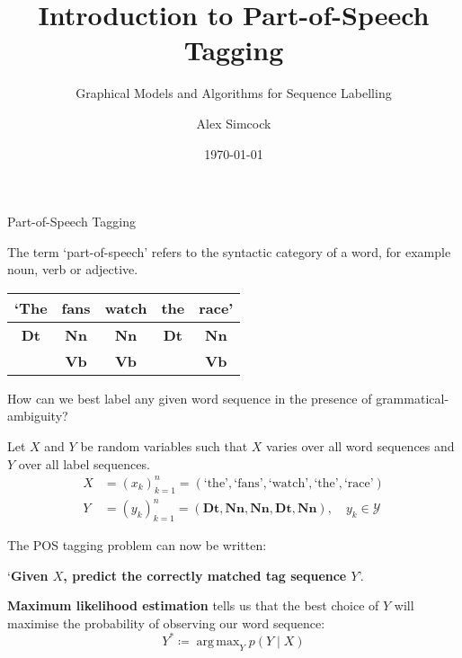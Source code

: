 \documentclass[envcountsect]{beamer}
\title{Introduction to Part-of-Speech Tagging}
\subtitle{Graphical Models and Algorithms for Sequence Labelling}
\author{Alex Simcock}
\institute{University of Birmingham}
\date{\today}
\DeclareMathOperator*{\argmax}{arg\,max}
\begin{document}
\begin{frame}
\titlepage
\end{frame}

\begin{frame}{Part-of-Speech Tagging}

\begin{definition}
The term `part-of-speech' refers to the syntactic category of a word, for example noun, verb or adjective.
\end{definition}

\begin{example}
\begin{center}
\begin{tabular}{ c c c c c }
 `The & fans & watch & the & race' \\
 \hline
 \textbf{Dt} & \textbf{Nn} & \textbf{Nn} & \textbf{Dt} & \textbf{Nn} \\  
 & \textbf{Vb} & \textbf{Vb} & & \textbf{Vb}    
\end{tabular}
\end{center}
\end{example}

How can we best label any given word sequence in the presence of grammatical-ambiguity?


\end{frame}

\begin{frame}

\begin{definition}

Let $X$ and $Y$ be random variables such that $X$ varies over all word sequences and $Y$ over all label sequences.
\begin{align*}
    X &= (x_k)_{k=1}^n = (\text{`the'}, \text{`fans'}, \text{`watch'}, \text{`the'}, \text{`race'}) \\
    Y &= (y_k)_{k=1}^n = (\textbf{Dt}, \textbf{Nn}, \textbf{Nn}, \textbf{Dt}, \textbf{Nn}), \quad y_k \in \mathcal{Y}
\end{align*}

The POS tagging problem can now be written:

`\textbf{Given $X$, predict the correctly matched tag sequence $Y$}'.

\end{definition}

\pause

\textbf{Maximum likelihood estimation} tells us that the best choice of $Y$ will maximise the probability of observing our word sequence:
\begin{equation*}
    Y^* \coloneqq \argmax_{Y} p(Y \mid X)
\end{equation*}    

\end{frame}
\end{document}
